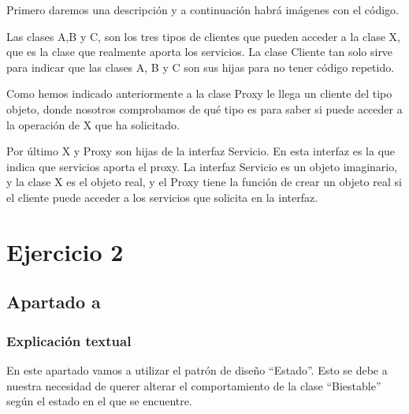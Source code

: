 \documentclass[11pt,a4paper]{article}
\begin{document}
Primero daremos una descripción y a continuación habrá imágenes con el código.

	Las clases A,B y C, son los tres tipos de clientes que pueden acceder a la clase X, que es la clase que realmente aporta los servicios. La clase Cliente tan solo sirve para indicar que las clases A, B y C son sus hijas para no tener código repetido.

	Como hemos indicado anteriormente a la clase Proxy le llega un cliente del tipo objeto, donde nosotros comprobamos de qué tipo es para saber si puede acceder a la operación de X que ha solicitado.
	
	Por último X y Proxy son hijas de la interfaz Servicio. En esta interfaz es la que indica que servicios aporta el proxy. La interfaz Servicio es un objeto imaginario, y la clase X es el objeto real, y el Proxy tiene la función de crear un objeto real si el cliente puede acceder a los servicios que solicita en la interfaz.
















\section{Ejercicio 2}
\subsection{Apartado a}

\subsubsection{Explicación textual}

En este apartado vamos a utilizar el patrón de diseño ``Estado''. Esto se debe a nuestra necesidad de querer alterar el comportamiento de la clase ``Biestable'' según el estado en el que se encuentre.
\end{document}
